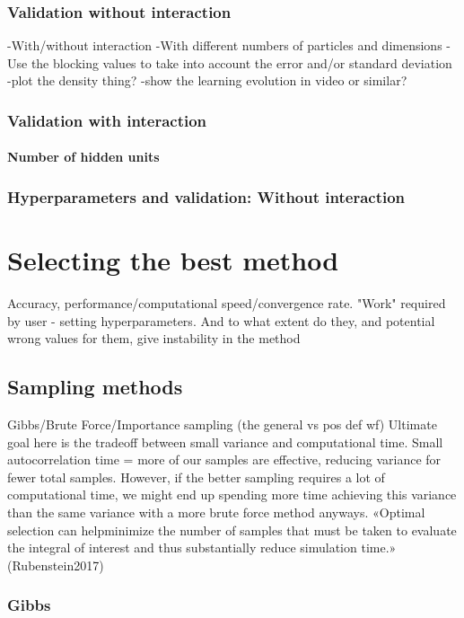 \documentclass[twoside,english]{uiofysmaster}
\begin{document}
\subsection{Validation without interaction}
-With/without interaction
-With different numbers of particles and dimensions
-Use the blocking values to take into account the error and/or standard deviation
-plot the density thing?
-show the learning evolution in video or similar?

\subsection{Validation with interaction}
\subsubsection{Number of hidden units}
\subsection{Hyperparameters and validation: Without interaction}






\chapter{Selecting the best method}
Accuracy, performance/computational speed/convergence rate. "Work" required by user - setting hyperparameters. And to what extent do they, and potential wrong values for them, give instability in the method
\section{Sampling methods}
Gibbs/Brute Force/Importance sampling (the general vs pos def wf)
Ultimate goal here is the tradeoff between small variance and computational time. Small autocorrelation time = more of our samples are effective, reducing variance for fewer total samples. However, if the better sampling requires a lot of computational time, we might end up spending more time achieving this variance than the same variance with a more brute force method anyways. «Optimal selection can helpminimize the number of samples that must be taken to evaluate the integral of interest and thus substantially reduce simulation time.» (Rubenstein2017)

\subsection{Gibbs}
\end{document}
